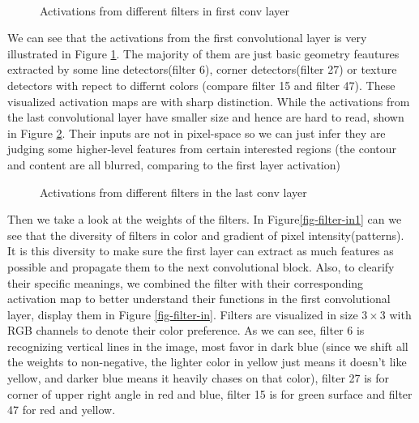 
\begin{figure}[H]
\centering
{}%
\\%
%
%
\caption{Activations from different filters in first conv layer}
\label{fig-acti-in}
\end{figure}

We can see that the activations from the first convolutional layer is very illustrated in Figure \ref{fig-acti-in}. The majority of them are just basic geometry feautures extracted by some line detectors(filter 6), corner detectors(filter 27) or texture detectors with repect to differnt colors (compare filter 15 and filter 47). These visualized activation maps are with sharp distinction. While the activations from the last convolutional layer have smaller size and hence are hard to read, shown in Figure \ref{fig-acti-out}. Their inputs are not in pixel-space so we can just infer they are judging some higher-level features from certain interested regions (the contour and content are all blurred, comparing to the first layer activation)

\begin{figure}[H]
\centering
{}%
%
%
%
\caption{Activations from different filters in the last conv layer}
\label{fig-acti-out}
\end{figure}


Then we take a look at the weights of the filters. In Figure\ref{fig-filter-in1} can we see that the diversity of filters in color and gradient of pixel intensity(patterns). It is this diversity to make sure the first layer can extract as much features as possible and propagate them to the next convolutional block. Also, to clearify their specific meanings, we combined the filter with their corresponding activation map to better understand their functions in the first convolutional layer, display them in Figure \ref{fig-filter-in}. Filters are visualized in size $3\times 3$ with RGB channels to denote their color preference. As we can see, filter 6 is recognizing vertical lines in the image, most favor in dark blue (since we shift all the weights to non-negative, the lighter color in yellow just means it doesn't like yellow, and darker blue means it heavily chases on that color), filter 27 is for corner of upper right angle in red and blue, filter 15 is for green surface and filter 47 for red and yellow.


